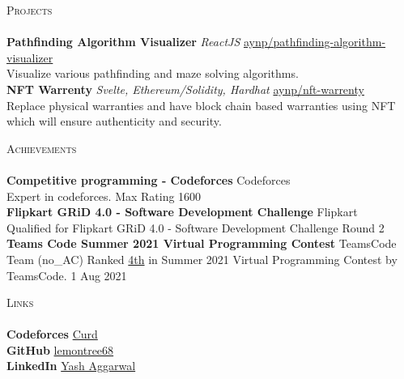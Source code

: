 \documentclass[a4paper]{article}
\newcommand{\lineunder} {
    \vspace*{-8pt} \\
    \hspace*{-18pt} \hrulefill \\
}
\newcommand{\header} [1] {
    {\hspace*{-18pt}\vspace*{6pt} \textsc{#1}}
    \vspace*{-6pt} \lineunder
}
\begin{document}
\header{Projects}
{\textbf{Pathfinding Algorithm Visualizer}} {\sl ReactJS} \hfill \href{https://github.com/aynp/pathfinding-algorithm-visualizer}{aynp/pathfinding-algorithm-visualizer}\\
Visualize various pathfinding and maze solving algorithms.\\
\vspace*{2mm}
{\textbf{NFT Warrenty}} {\sl Svelte, Ethereum/Solidity, Hardhat} \hfill \href{https://github.com/aynp/nft-warrenty}{aynp/nft-warrenty}\\
Replace physical warranties and have block chain based warranties using NFT which will ensure authenticity and security.\\
\vspace*{2mm}

\header{Achievements}
\textbf{Competitive programming - Codeforces} \hfill Codeforces\\
Expert in codeforces. \hfill Max Rating 1600\\
\vspace*{2mm}
\textbf{Flipkart GRiD 4.0 - Software Development Challenge} \hfill Flipkart\\
Qualified for Flipkart GRiD 4.0 - Software Development Challenge Round 2 \hfill \\
\vspace*{2mm}
\textbf{Teams Code Summer 2021 Virtual Programming Contest} \hfill TeamsCode\\
Team (no\_AC) Ranked \href{https://youtu.be/eCylTCHctY0?t=16137}{4th} in Summer 2021 Virtual Programming Contest by TeamsCode. \hfill 1 Aug 2021\\
\vspace*{2mm}


\header{Links}
{\textbf{Codeforces}} \hfill \href{https://codeforces.com/profile/Curd}{Curd}\\
\vspace*{2mm}
{\textbf{GitHub}} \hfill \href{https://github.com/lemontree68}{lemontree68}\\
\vspace*{2mm}
{\textbf{LinkedIn}} \hfill \href{https://www.linkedin.com/in/yash-aggarwal-315847203/}{Yash Aggarwal}\\
\
\end{document}
